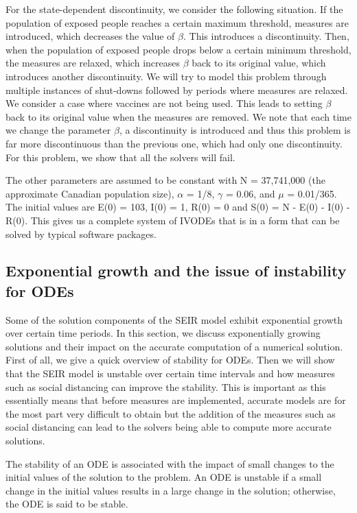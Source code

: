 For the state-dependent discontinuity, we consider the following situation. If the population of exposed people reaches a certain maximum threshold, measures are introduced, which decreases the value of $\beta$. This introduces a discontinuity. Then, when the population of exposed people drops below a certain minimum threshold, the measures are relaxed, which increases $\beta$ back to its original value, which introduces another discontinuity. We will try to model this problem through multiple instances of shut-downs followed by periods where measures are relaxed. We consider a case where vaccines are not being used. This leads to setting $\beta$ back to its original value when the measures are removed. We note that each time we change the parameter $\beta$, a discontinuity is introduced and thus this problem is far more discontinuous than the previous one, which had only one discontinuity. For this problem, we show that all the solvers will fail.

The other parameters are assumed to be constant with N = 37,741,000 (the approximate Canadian population size), $\alpha$ = 1/8, $\gamma$ = 0.06, and $\mu$ = 0.01/365. The initial values are E(0) = 103, I(0) = 1, R(0) = 0 and S(0) = N - E(0) - I(0) - R(0). This gives us a complete system of IVODEs that is in a form that can be solved by typical software packages.

\subsection{Exponential growth and the issue of instability for ODEs}
\label{subsection:exponential_growth}
Some of the solution components of the SEIR model exhibit exponential growth over certain time periods. In this section, we discuss exponentially growing solutions and their impact on the accurate computation of a numerical solution. First of all, we give a quick overview of stability for ODEs. Then we will show that the SEIR model is unstable over certain time intervals and how measures such as social distancing can improve the stability. This is important as this essentially means that before measures are implemented, accurate models are for the most part very difficult to obtain but the addition of the measures such as social distancing can lead to the solvers being able to compute more accurate solutions.

The stability of an ODE is associated with the impact of small changes to the initial values of the solution to the problem. An ODE is unstable if a small change in the initial values results in a large change in the solution; otherwise, the ODE is said to be stable.

